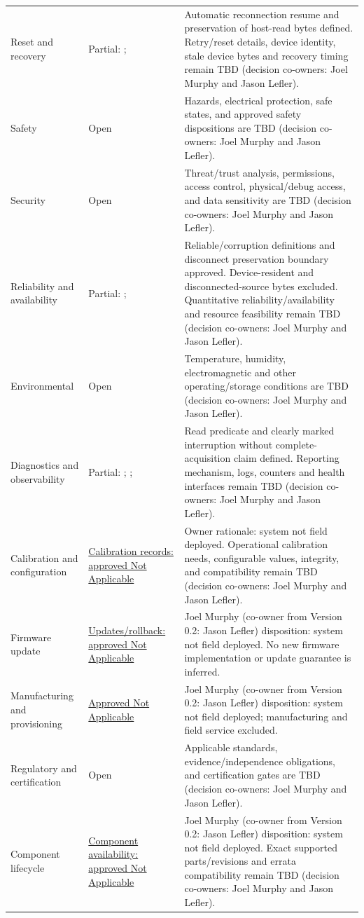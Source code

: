 \begin{tabularx}{\linewidth}{L{3.4cm}L{4.2cm}Y}
Reset and recovery & Partial: ;  & Automatic reconnection resume and preservation of host-read bytes defined. Retry/reset details, device identity, stale device bytes and recovery timing remain TBD (decision co-owners: Joel Murphy and Jason Lefler).\\
Safety & Open & Hazards, electrical protection, safe states, and approved safety dispositions are TBD (decision co-owners: Joel Murphy and Jason Lefler).\\
Security & Open & Threat/trust analysis, permissions, access control, physical/debug access, and data sensitivity are TBD (decision co-owners: Joel Murphy and Jason Lefler).\\
Reliability and availability & Partial: ;  & Reliable/corruption definitions and disconnect preservation boundary approved. Device-resident and disconnected-source bytes excluded. Quantitative reliability/availability and resource feasibility remain TBD (decision co-owners: Joel Murphy and Jason Lefler).\\
Environmental & Open & Temperature, humidity, electromagnetic and other operating/storage conditions are TBD (decision co-owners: Joel Murphy and Jason Lefler).\\
Diagnostics and observability & Partial: ; ;  & Read predicate and clearly marked interruption without complete-acquisition claim defined. Reporting mechanism, logs, counters and health interfaces remain TBD (decision co-owners: Joel Murphy and Jason Lefler).\\
Calibration and configuration & \hyperref[Section:ProjectSustainmentNotes]{Calibration records: approved Not Applicable} & Owner rationale: system not field deployed. Operational calibration needs, configurable values, integrity, and compatibility remain TBD (decision co-owners: Joel Murphy and Jason Lefler).\\
Firmware update & \hyperref[Section:ProjectSustainmentNotes]{Updates/rollback: approved Not Applicable} & Joel Murphy (co-owner from Version 0.2: Jason Lefler) disposition: system not field deployed. No new firmware implementation or update guarantee is inferred.\\
Manufacturing and provisioning & \hyperref[Section:ProjectSustainmentNotes]{Approved Not Applicable} & Joel Murphy (co-owner from Version 0.2: Jason Lefler) disposition: system not field deployed; manufacturing and field service excluded.\\
Regulatory and certification & Open & Applicable standards, evidence/independence obligations, and certification gates are TBD (decision co-owners: Joel Murphy and Jason Lefler).\\
Component lifecycle & \hyperref[Section:ProjectSustainmentNotes]{Component availability: approved Not Applicable} & Joel Murphy (co-owner from Version 0.2: Jason Lefler) disposition: system not field deployed. Exact supported parts/revisions and errata compatibility remain TBD (decision co-owners: Joel Murphy and Jason Lefler).\\
\end{tabularx}
\normalsize
